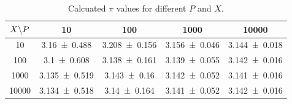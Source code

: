 \begin{table}
\centering
\caption{
    Calcuated $\pi$ values for different $P$ and $X$.
    }
\vspace{0.2cm}
\label{tab:ex1.5_pi_values}
\begin{tabular}{c|cccc}
\toprule
$X \text\textbackslash P$ & 10 & 100 & 1000 & 10000 \\
\midrule
10 & \num{3.16 \pm 0.488} & \num{3.208 \pm 0.156} & \num{3.156 \pm 0.046} & \num{3.144 \pm 0.018} \\
100 & \num{3.1 \pm 0.608} & \num{3.138 \pm 0.161} & \num{3.139 \pm 0.055} & \num{3.142 \pm 0.016} \\
1000 & \num{3.135 \pm 0.519} & \num{3.143 \pm 0.16} & \num{3.142 \pm 0.052} & \num{3.141 \pm 0.016} \\
10000 & \num{3.134 \pm 0.518} & \num{3.14 \pm 0.164} & \num{3.141 \pm 0.052} & \num{3.142 \pm 0.016} \\
\bottomrule
\end{tabular}
\end{table}
